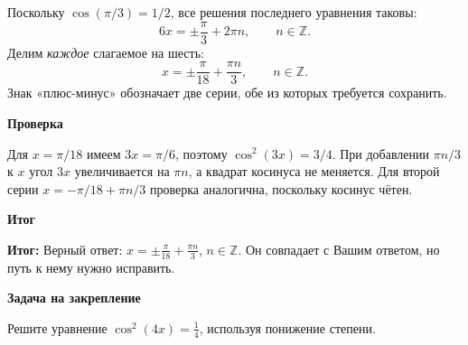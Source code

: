 \documentclass[12pt,a4paper]{article}
\newcommand{\heading}[1]{\par\vspace{4pt}\textbf{#1}\par}
\newcommand{\result}{\textcolor{teal!60!black}{\textbf{Итог:}}}
\begin{document}
Поскольку $\cos(\pi/3)=1/2$, все решения последнего уравнения таковы:
\[
6x=\pm\frac\pi3+2\pi n,\qquad n\in\mathbb Z.
\]
Делим \emph{каждое} слагаемое на шесть:
\[
\boxed{x=\pm\frac\pi{18}+\frac{\pi n}{3}},
\qquad n\in\mathbb Z.
\]
Знак «плюс-минус» обозначает две серии, обе из которых требуется сохранить.
\heading{Проверка}
Для $x=\pi/18$ имеем $3x=\pi/6$, поэтому $\cos^2(3x)=3/4$. При добавлении $\pi n/3$ к $x$ угол $3x$ увеличивается на $\pi n$, а квадрат косинуса не меняется. Для второй серии $x=-\pi/18+\pi n/3$ проверка аналогична, поскольку косинус чётен.
\heading{Итог}
\result{} Верный ответ: $\displaystyle x=\pm\frac\pi{18}+\frac{\pi n}{3}$, $n\in\mathbb Z$. Он совпадает с Вашим ответом, но путь к нему нужно исправить.
\heading{Задача на закрепление}
Решите уравнение $\displaystyle\cos^2(4x)=\frac14$, используя понижение степени.
\newpage
{}\label{task:9}
\end{document}
